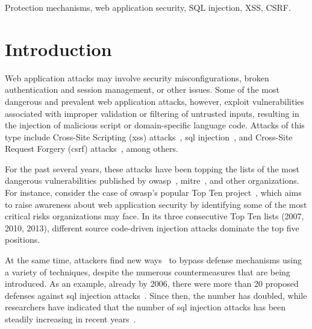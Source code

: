 \documentclass[conference]{IEEEtran}
\begin{document}
\begin{IEEEkeywords}
Protection mechanisms, web application security,
SQL injection, XSS, CSRF.
\end{IEEEkeywords}

\IEEEpeerreviewmaketitle

\section{Introduction}

Web application attacks may involve security misconfigurations, broken
authentication and session management, or other issues. Some of the
most dangerous and prevalent web application attacks, however,
exploit vulnerabilities associated with improper validation or filtering
of untrusted inputs, resulting in the injection of malicious
script or domain-specific language code.
Attacks of this type include Cross-Site Scripting ({\sc xss})
attacks~\cite{SG07}, {\sc sql} injection~\cite{RL12b}, and
Cross-Site Request Forgery ({\sc csrf}) attacks~\cite{LZRL09}, among
others.

For the past several years,
these attacks have been topping the lists of the most dangerous vulnerabilities
published by {\sc owasp}~\cite{OWASPtop10},
{\sc mitre}~\cite{MITREtop25}, and other organizations.
For instance, consider the case of {\sc owasp}'s popular Top Ten
project~\cite{OWASPtop10},
which aims to raise awareness about web application security by
identifying some of the most critical risks organizations may face.
In its three consecutive Top Ten lists (2007, 2010, 2013), different source
code-driven injection attacks dominate the top five positions.

At the same time, attackers find new ways~\cite{HNSHS12,DKH14}
to bypass defense mechanisms using a variety of techniques,
despite the numerous countermeasures that are being introduced.
As an example, already by 2006,
there were more than 20 proposed defenses
against {\sc sql} injection attacks~\cite{HVO06}.
Since then, the number has doubled, while researchers have indicated that
the number of {\sc sql} injection attacks has been steadily
increasing in recent years~\cite{SSL12}.
\end{document}
